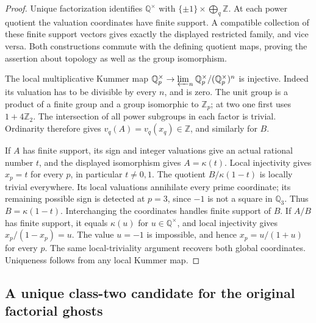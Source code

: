 \begin{proof}
Unique factorization identifies $\mathbb Q^\times$ with
$\{\pm1\}\times\bigoplus_q\mathbb Z$. At each power quotient the valuation
coordinates have finite support. A compatible collection of these finite
support vectors gives exactly the displayed restricted family, and vice
versa. Both constructions commute with the defining quotient maps, proving
the assertion about topology as well as the group isomorphism.

The local multiplicative Kummer map
$\mathbb Q_p^\times\to\varprojlim_n\mathbb Q_p^\times/(\mathbb Q_p^\times)^n$
is injective. Indeed its valuation has to be divisible by every $n$, and
is zero. The unit group is a product of a finite group and a group
isomorphic to $\mathbb Z_p$; at two one first uses $1+4\mathbb Z_2$.
The intersection of all power subgroups in each factor is trivial.
Ordinarity therefore gives $v_q(A)=v_q(x_q)\in\mathbb Z$, and similarly
for $B$.

If $A$ has finite support, its sign and integer valuations give an actual
rational number $t$, and the displayed isomorphism gives $A=\kappa(t)$.
Local injectivity gives $x_p=t$ for every $p$, in particular $t\ne0,1$.
The quotient $B/\kappa(1-t)$ is locally trivial everywhere. Its local
valuations annihilate every prime coordinate; its remaining possible sign
is detected at $p=3$, since $-1$ is not a square in $\mathbb Q_3$.
Thus $B=\kappa(1-t)$. Interchanging the coordinates handles finite support
of $B$. If $A/B$ has finite support, it equals $\kappa(u)$ for
$u\in\mathbb Q^\times$, and local injectivity gives
$x_p/(1-x_p)=u$. The value $u=-1$ is impossible, and hence
$x_p=u/(1+u)$ for every $p$. The same local-triviality argument recovers
both global coordinates. Uniqueness follows from any local Kummer map.
\end{proof}

\subsection{A unique class-two candidate for the original factorial ghosts}

